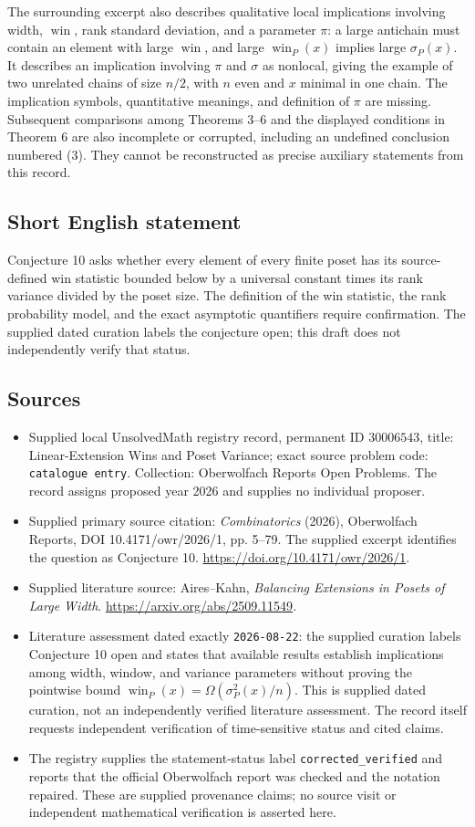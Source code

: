 \documentclass[11pt]{article}
\begin{document}
The surrounding excerpt also describes qualitative local implications involving width, \(\operatorname{win}\), rank standard deviation, and a parameter \(\pi\): a large antichain must contain an element with large \(\operatorname{win}\), and large \(\operatorname{win}_P(x)\) implies large \(\sigma_P(x)\). It describes an implication involving \(\pi\) and \(\sigma\) as nonlocal, giving the example of two unrelated chains of size \(n/2\), with \(n\) even and \(x\) minimal in one chain. The implication symbols, quantitative meanings, and definition of \(\pi\) are missing. Subsequent comparisons among Theorems 3--6 and the displayed conditions in Theorem 6 are also incomplete or corrupted, including an undefined conclusion numbered (3). They cannot be reconstructed as precise auxiliary statements from this record.
\subsection{Short English statement}
Conjecture 10 asks whether every element of every finite poset has its source-defined win statistic bounded below by a universal constant times its rank variance divided by the poset size. The definition of the win statistic, the rank probability model, and the exact asymptotic quantifiers require confirmation. The supplied dated curation labels the conjecture open; this draft does not independently verify that status.
\subsection{Sources}
\begin{itemize}
\item Supplied local UnsolvedMath registry record, permanent ID \(30006543\), title: Linear-Extension Wins and Poset Variance; exact source problem code: \texttt{catalogue entry}. Collection: Oberwolfach Reports Open Problems. The record assigns proposed year 2026 and supplies no individual proposer.
\item Supplied primary source citation: \emph{Combinatorics} (2026), Oberwolfach Reports, DOI 10.4171/owr/2026/1, pp. 5--79. The supplied excerpt identifies the question as Conjecture 10. \url{https://doi.org/10.4171/owr/2026/1}.
\item Supplied literature source: Aires--Kahn, \emph{Balancing Extensions in Posets of Large Width}. \url{https://arxiv.org/abs/2509.11549}.
\item Literature assessment dated exactly \texttt{2026-08-22}: the supplied curation labels Conjecture 10 open and states that available results establish implications among width, window, and variance parameters without proving the pointwise bound \(\operatorname{win}_P(x)=\Omega(\sigma_P^2(x)/n)\). This is supplied dated curation, not an independently verified literature assessment. The record itself requests independent verification of time-sensitive status and cited claims.
\item The registry supplies the statement-status label \texttt{corrected\_verified} and reports that the official Oberwolfach report was checked and the notation repaired. These are supplied provenance claims; no source visit or independent mathematical verification is asserted here.
\end{itemize}
\end{document}
